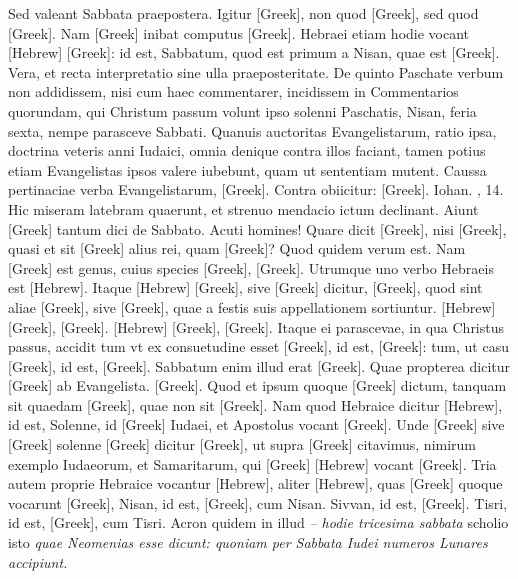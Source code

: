 Sed valeant Sabbata praepostera.
Igitur \textgreek{[Greek]}, non quod \textgreek{[Greek]}, sed
quod \textgreek{[Greek]}.
Nam \textgreek{[Greek]} inibat
computus \textgreek{[Greek]}.
Hebraei etiam hodie vocant \texthebrew{[Hebrew]}
\textgreek{[Greek]}: id est, Sabbatum, quod est primum a
 Nisan, quae est \textgreek{[Greek]}.
Vera, et recta interpretatio sine ulla praeposteritate.
De quinto Paschate verbum non addidissem,
nisi cum haec commentarer, incidissem in Commentarios quorundam,
qui Christum passum volunt ipso solenni Paschatis, 
Nisan, feria sexta, nempe parasceve Sabbati.
Quanuis auctoritas
Evangelistarum, ratio ipsa, doctrina veteris anni Iudaici, omnia
denique contra illos faciant, tamen potius etiam Evangelistas ipsos
valere iubebunt, quam ut sententiam mutent.
Caussa pertinaciae
verba Evangelistarum, \textgreek{[Greek]}.
Contra obiicitur:
\textgreek{[Greek]}.
Iohan. , 14.
Hic miseram latebram quaerunt,
et strenuo mendacio ictum declinant.
Aiunt \textgreek{[Greek]} tantum
dici de Sabbato.
Acuti homines!
Quare dicit \textgreek{[Greek]},
nisi \textgreek{[Greek]}, quasi et sit \textgreek{[Greek]}
 alius rei, quam \textgreek{[Greek]}?
Quod quidem verum est.
Nam \textgreek{[Greek]} est genus, cuius species
\textgreek{[Greek]}, \textgreek{[Greek]}.
Utrumque uno verbo Hebraeis est
\texthebrew{[Hebrew]}.
Itaque \texthebrew{[Hebrew]} \textgreek{[Greek]},
 sive \textgreek{[Greek]} dicitur,
\textgreek{[Greek]}, quod sint aliae \textgreek{[Greek]},
 sive \textgreek{[Greek]}, quae a festis
suis appellationem sortiuntur.
\texthebrew{[Hebrew]} \textgreek{[Greek]}, \textgreek{[Greek]}.
\texthebrew{[Hebrew]} \textgreek{[Greek]}, \textgreek{[Greek]}.
Itaque ei parascevae, in qua Christus passus, accidit tum
vt ex consuetudine esset \textgreek{[Greek]}, id est, \textgreek{[Greek]}:
tum, ut casu \textgreek{[Greek]}, id est, \textgreek{[Greek]}.
Sabbatum enim
illud erat \textgreek{[Greek]}.
Quae propterea dicitur \textgreek{[Greek]}
ab Evangelista.
\textgreek{[Greek]}.
Quod
et ipsum quoque \textgreek{[Greek]} dictum, tanquam sit quaedam
 \textgreek{[Greek]},
quae non sit \textgreek{[Greek]}.
Nam quod Hebraice dicitur \texthebrew{[Hebrew]},
id est, Solenne, id \textgreek{[Greek]} Iudaei, et Apostolus vocant
 \textgreek{[Greek]}.
Unde \textgreek{[Greek]} sive \textgreek{[Greek]} solenne
 \textgreek{[Greek]}
dicitur \textgreek{[Greek]}, ut supra \textgreek{[Greek]} citavimus, nimirum
exemplo Iudaeorum, et Samaritarum, qui \textgreek{[Greek]}
\texthebrew{[Hebrew]} vocant \textgreek{[Greek]}.
Tria autem proprie Hebraice vocantur \texthebrew{[Hebrew]},
aliter \texthebrew{[Hebrew]}, quas \textgreek{[Greek]} quoque vocarunt
 \textgreek{[Greek]},  Nisan, id est, \textgreek{[Greek]},
 cum  Nisan.
 Sivvan,
id est, \textgreek{[Greek]}.
 Tisri, id est, \textgreek{[Greek]}, cum
  Tisri.
Acron quidem in illud \textit{– hodie tricesima sabbata} scholio isto
\textit{quae Neomenias esse dicunt: quoniam per Sabbata Iudei numeros Lunares
accipiunt.}

